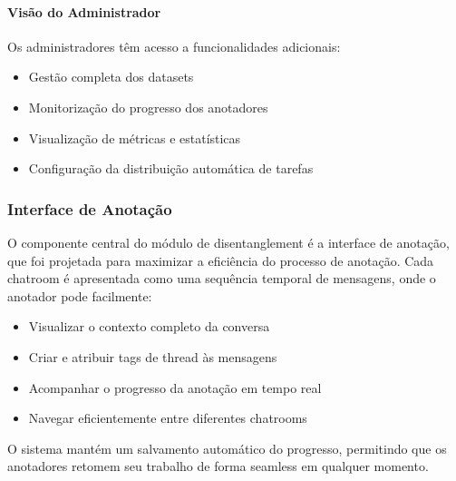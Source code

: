 \paragraph{Visão do Administrador}
Os administradores têm acesso a funcionalidades adicionais:
\begin{itemize}
    \item Gestão completa dos datasets
    \item Monitorização do progresso dos anotadores
    \item Visualização de métricas e estatísticas
    \item Configuração da distribuição automática de tarefas
\end{itemize}

\subsubsection{Interface de Anotação}
O componente central do módulo de disentanglement é a interface de anotação, que foi projetada para maximizar a eficiência do processo de anotação. Cada chatroom é apresentada como uma sequência temporal de mensagens, onde o anotador pode facilmente:
\begin{itemize}
    \item Visualizar o contexto completo da conversa
    \item Criar e atribuir tags de thread às mensagens
    \item Acompanhar o progresso da anotação em tempo real
    \item Navegar eficientemente entre diferentes chatrooms
\end{itemize}

O sistema mantém um salvamento automático do progresso, permitindo que os anotadores retomem seu trabalho de forma seamless em qualquer momento.


